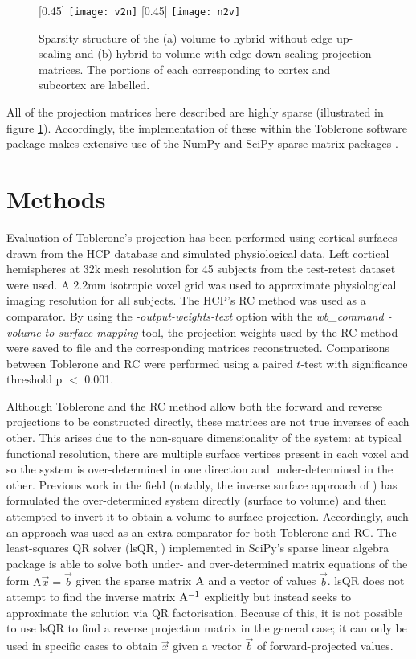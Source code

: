 \begin{figure}[H]
\centering
\subcaptionbox{\label{v2n_mat}}[0.45\textwidth]
{\texttt{[image: v2n]}}
\subcaptionbox{\label{n2v_mat}}[0.45\textwidth]
{\texttt{[image: n2v]}}
\caption{Sparsity structure of the (a) volume to hybrid without edge up-scaling and (b) hybrid to volume with edge down-scaling projection matrices. The portions of each corresponding to cortex and subcortex are labelled.} 
\label{sparsity}
\end{figure}

All of the projection matrices here described are highly sparse (illustrated in figure \ref{sparsity}). Accordingly, the implementation of these within the Toblerone software package makes extensive use of the NumPy and SciPy sparse matrix packages \cite{Walt2011, Virtanen2020}.


\section{Methods}
Evaluation of Toblerone's projection has been performed using cortical surfaces drawn from the HCP database \cite{HCP_data, Glasser2013} and simulated physiological data. Left cortical hemispheres at 32k mesh resolution for 45 subjects from the test-retest dataset were used. A 2.2mm isotropic voxel grid was used to approximate physiological imaging resolution for all subjects. The HCP's RC method was used as a comparator. By using the \textit{-output-weights-text} option with the \textit{wb\_command -volume-to-surface-mapping} tool, the projection weights used by the RC method were saved to file and the corresponding matrices reconstructed. Comparisons between Toblerone and RC were performed using a paired $t$-test with significance threshold p $<$ 0.001. 

Although Toblerone and the RC method allow both the forward and reverse projections to be constructed directly, these matrices are not true inverses of each other. This arises due to the non-square dimensionality of the system: at typical functional resolution, there are multiple surface vertices present in each voxel and so the system is over-determined in one direction and under-determined in the other. Previous work in the field (notably, the inverse surface approach of \cite{Lonjaret2017}) has formulated the over-determined system directly (surface to volume) and then attempted to invert it to obtain a volume to surface projection. Accordingly, such an approach was used as an extra comparator for both Toblerone and RC. The least-squares QR solver (lsQR, \cite{10.1145/355984.355989}) implemented in SciPy's sparse linear algebra package is able to solve both under- and over-determined matrix equations of the form $\mathrm{A}\vec{x} = \vec{b}$ given the sparse matrix $\mathrm{A}$ and a vector of values $\vec{b}$. lsQR does not attempt to find the inverse matrix $\mathrm{A}^{-1}$ explicitly but instead seeks to approximate the solution via QR factorisation. Because of this, it is not possible to use lsQR to find a reverse projection matrix in the general case; it can only be used in specific cases to obtain $\vec{x}$ given a vector $\vec{b}$ of forward-projected values. 

